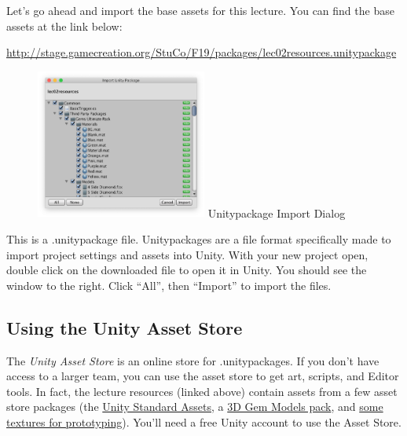\documentclass[11pt]{article}
\begin{document}
Let's go ahead and import the base assets for this lecture.  You can find the base assets at the link below:
\begin{center}
\href{http://stage.gamecreation.org/StuCo/F19/packages/lec02resources.unitypackage}{http://stage.gamecreation.org/StuCo/F19/packages/lec02resources.unitypackage}
\end{center}

\pagebreak

\begin{figure}
    \centering
    \includegraphics[width=0.5\textwidth]{import-diag}
    Unitypackage Import Dialog
\end{figure}

This is a .unitypackage file.  Unitypackages are a file format specifically made to import project settings and assets into Unity.  With your new project open, double click on the downloaded file to open it in Unity.  You should see the window to the right.  Click ``All'', then ``Import'' to import the files.

\subsection{Using the Unity Asset Store}

The \textit{Unity Asset Store} is an online store for .unitypackages.  If you don't have access to a larger team, you can use the asset store to get art, scripts, and Editor tools.  In fact, the lecture resources (linked above) contain assets from a few asset store packages (the \href{https://assetstore.unity.com/packages/essentials/asset-packs/standard-assets-32351}{Unity Standard Assets}, a \href{https://assetstore.unity.com/packages/3d/props/3d-crystal-gems-pack-112381}{3D Gem Models pack}, and \href{https://assetstore.unity.com/packages/2d/textures-materials/gridbox-prototype-materials-129127}{some textures for prototyping}).  You'll need a free Unity account to use the Asset Store.
\end{document}
